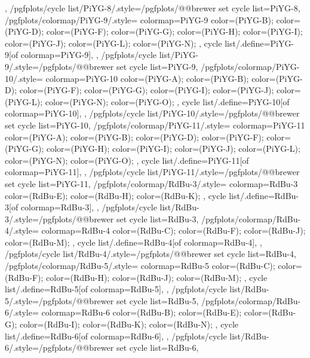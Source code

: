 {{  },
  /pgfplots/cycle list/PiYG-8/.style={/pgfplots/@@brewer set cycle list={PiYG-8}},
  /pgfplots/colormap/PiYG-9/.style={
    colormap={PiYG-9}{
      color=(PiYG-B);
      color=(PiYG-D);
      color=(PiYG-F);
      color=(PiYG-G);
      color=(PiYG-H);
      color=(PiYG-I);
      color=(PiYG-J);
      color=(PiYG-L);
      color=(PiYG-N);
    },
    cycle list/.define={PiYG-9}{[of colormap=PiYG-9]},
  },
  /pgfplots/cycle list/PiYG-9/.style={/pgfplots/@@brewer set cycle list={PiYG-9}},
  /pgfplots/colormap/PiYG-10/.style={
    colormap={PiYG-10}{
      color=(PiYG-A);
      color=(PiYG-B);
      color=(PiYG-D);
      color=(PiYG-F);
      color=(PiYG-G);
      color=(PiYG-I);
      color=(PiYG-J);
      color=(PiYG-L);
      color=(PiYG-N);
      color=(PiYG-O);
    },
    cycle list/.define={PiYG-10}{[of colormap=PiYG-10]},
  },
  /pgfplots/cycle list/PiYG-10/.style={/pgfplots/@@brewer set cycle list={PiYG-10}},
  /pgfplots/colormap/PiYG-11/.style={
    colormap={PiYG-11}{
      color=(PiYG-A);
      color=(PiYG-B);
      color=(PiYG-D);
      color=(PiYG-F);
      color=(PiYG-G);
      color=(PiYG-H);
      color=(PiYG-I);
      color=(PiYG-J);
      color=(PiYG-L);
      color=(PiYG-N);
      color=(PiYG-O);
    },
    cycle list/.define={PiYG-11}{[of colormap=PiYG-11]},
  },
  /pgfplots/cycle list/PiYG-11/.style={/pgfplots/@@brewer set cycle list={PiYG-11}},
  /pgfplots/colormap/RdBu-3/.style={
    colormap={RdBu-3}{
      color=(RdBu-E);
      color=(RdBu-H);
      color=(RdBu-K);
    },
    cycle list/.define={RdBu-3}{[of colormap=RdBu-3]},
  },
  /pgfplots/cycle list/RdBu-3/.style={/pgfplots/@@brewer set cycle list={RdBu-3}},
  /pgfplots/colormap/RdBu-4/.style={
    colormap={RdBu-4}{
      color=(RdBu-C);
      color=(RdBu-F);
      color=(RdBu-J);
      color=(RdBu-M);
    },
    cycle list/.define={RdBu-4}{[of colormap=RdBu-4]},
  },
  /pgfplots/cycle list/RdBu-4/.style={/pgfplots/@@brewer set cycle list={RdBu-4}},
  /pgfplots/colormap/RdBu-5/.style={
    colormap={RdBu-5}{
      color=(RdBu-C);
      color=(RdBu-F);
      color=(RdBu-H);
      color=(RdBu-J);
      color=(RdBu-M);
    },
    cycle list/.define={RdBu-5}{[of colormap=RdBu-5]},
  },
  /pgfplots/cycle list/RdBu-5/.style={/pgfplots/@@brewer set cycle list={RdBu-5}},
  /pgfplots/colormap/RdBu-6/.style={
    colormap={RdBu-6}{
      color=(RdBu-B);
      color=(RdBu-E);
      color=(RdBu-G);
      color=(RdBu-I);
      color=(RdBu-K);
      color=(RdBu-N);
    },
    cycle list/.define={RdBu-6}{[of colormap=RdBu-6]},
  },
  /pgfplots/cycle list/RdBu-6/.style={/pgfplots/@@brewer set cycle list={RdBu-6}},
}
